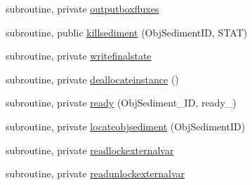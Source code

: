 \begin{DoxyCompactItemize}
\item 
subroutine, private \mbox{\hyperlink{namespacemodulesediment_abf7a07c3cdbe931d82c21146e433eaeb}{outputboxfluxes}}
\item 
subroutine, public \mbox{\hyperlink{namespacemodulesediment_a3799836daf0cb05055644810de5e7fd0}{killsediment}} (Obj\+Sediment\+ID, S\+T\+AT)
\item 
subroutine, private \mbox{\hyperlink{namespacemodulesediment_a1f674dbab21e666bea43953621c4cce3}{writefinalstate}}
\item 
subroutine, private \mbox{\hyperlink{namespacemodulesediment_aaca3b711a9cb64af8d2ec951a1338ddd}{deallocateinstance}} ()
\item 
subroutine, private \mbox{\hyperlink{namespacemodulesediment_a2427e7af36c908526797cc897f1dca07}{ready}} (Obj\+Sediment\+\_\+\+ID, ready\+\_\+)
\item 
subroutine, private \mbox{\hyperlink{namespacemodulesediment_a3719cfe21de51d5aff6e236bffdbe06d}{locateobjsediment}} (Obj\+Sediment\+ID)
\item 
subroutine, private \mbox{\hyperlink{namespacemodulesediment_a94b876e44c6f435015c969c6a2f32978}{readlockexternalvar}}
\item 
subroutine, private \mbox{\hyperlink{namespacemodulesediment_a8c3164236748ba94c8bef14c5dd430b9}{readunlockexternalvar}}
\end{DoxyCompactItemize}
